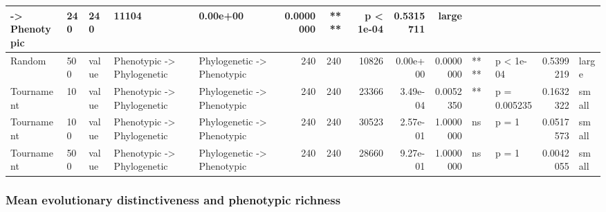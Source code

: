 \documentclass[]{book}
\begin{document}
\begin{table}
\begin{tabular}[t]{l|l|l|l|l|r|r|r|r|r|l|l|r|l}
    ->
Phenotypic & 240 & 240 & 11104 & 0.00e+00 & 0.0000000 & **** & p < 1e-04 & 0.5315711 & large\\
\hline
Random & 500 & value & Phenotypic
    ->
Phylogenetic & Phylogenetic
    ->
Phenotypic & 240 & 240 & 10826 & 0.00e+00 & 0.0000000 & **** & p < 1e-04 & 0.5399219 & large\\
\hline
Tournament & 10 & value & Phenotypic
    ->
Phylogenetic & Phylogenetic
    ->
Phenotypic & 240 & 240 & 23366 & 3.49e-04 & 0.0052350 & ** & p = 0.005235 & 0.1632322 & small\\
\hline
Tournament & 100 & value & Phenotypic
    ->
Phylogenetic & Phylogenetic
    ->
Phenotypic & 240 & 240 & 30523 & 2.57e-01 & 1.0000000 & ns & p = 1 & 0.0517573 & small\\
\hline
Tournament & 500 & value & Phenotypic
    ->
Phylogenetic & Phylogenetic
    ->
Phenotypic & 240 & 240 & 28660 & 9.27e-01 & 1.0000000 & ns & p = 1 & 0.0042055 & small\\
\hline
\end{tabular}
\end{table}

\hypertarget{mean-evolutionary-distinctiveness-and-phenotypic-richness-1}{%
\subsubsection{Mean evolutionary distinctiveness and phenotypic richness}\label{mean-evolutionary-distinctiveness-and-phenotypic-richness-1}}
\end{document}
